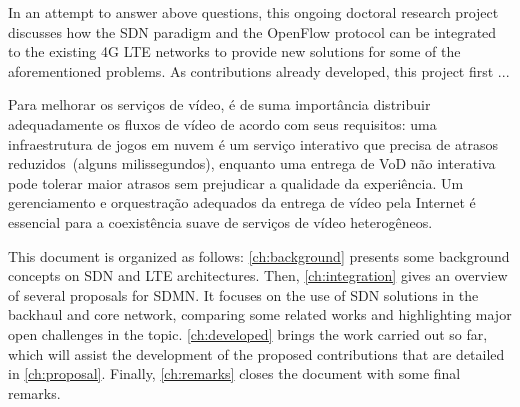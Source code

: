 
In an attempt to answer above questions, this ongoing doctoral research project discusses how the \ac{SDN} paradigm and the OpenFlow protocol can be integrated to the existing 4G \ac{LTE} networks to provide new solutions for some of the aforementioned problems. As contributions already developed, this project first ...

Para melhorar os serviços de vídeo, é de suma importância distribuir adequadamente os fluxos de vídeo de acordo com seus requisitos: uma infraestrutura de jogos em nuvem é um serviço interativo que precisa de atrasos reduzidos~(alguns milissegundos), enquanto uma entrega de VoD não interativa pode tolerar maior atrasos sem prejudicar a qualidade da experiência. Um gerenciamento e orquestração adequados da entrega de vídeo pela Internet é essencial para a coexistência suave de serviços de vídeo heterogêneos. 

This document is organized as follows: \autoref{ch:background} presents some
background concepts on \ac{SDN} and \ac{LTE} architectures. Then,
\autoref{ch:integration} gives an overview of several proposals for \ac{SDMN}.
It focuses on the use of \ac{SDN} solutions in the backhaul and core network,
comparing some related works and highlighting major open challenges in the
topic. \autoref{ch:developed} brings the work carried out so far, which will
assist the development of the proposed contributions that are detailed in
\autoref{ch:proposal}. Finally, \autoref{ch:remarks} closes the document with
some final remarks.

